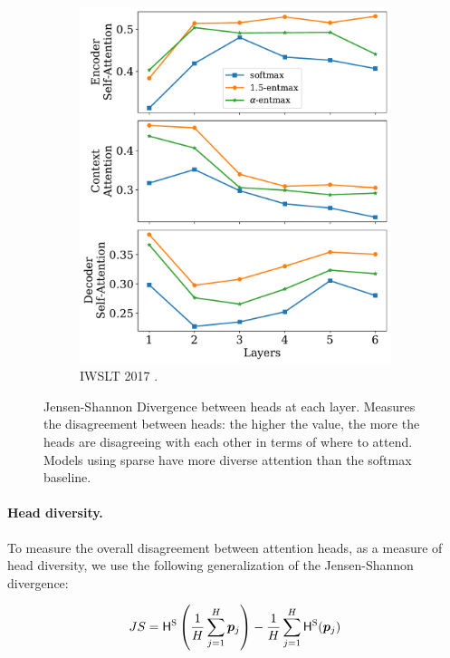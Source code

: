 \begin{figure}[!htbp]
\begin{subfigure}[b]{.49\linewidth}
        \includegraphics[width=\linewidth]{Figures/js_divs_de.pdf}
        \caption{%
            \label{fig:js_divs_de}%
            IWSLT 2017 .}
    \end{subfigure}
    \caption{%
        \label{fig:js_divs}
        Jensen-Shannon Divergence between heads at each layer. Measures the
        disagreement between heads: the higher the value, the more the heads
        are disagreeing with each other in terms of where to attend. Models
        using sparse \entmaxtext have more diverse attention than the softmax
        baseline.
    }
\end{figure}

\paragraph*{Head diversity.} To measure the overall disagreement
between attention heads, as a measure of head diversity, we use the
following generalization of the Jensen-Shannon divergence:

\begin{equation}
    JS = \mathsf{H}^\textsc{S}\left(\frac{1}{H}\sum_{j=1}^H \bm{p}_{j}\right) -
    \frac{1}{H}\sum_{j=1}^{H}
    \mathsf{H}^\textsc{S}(\bm{p}_j)
\end{equation}


